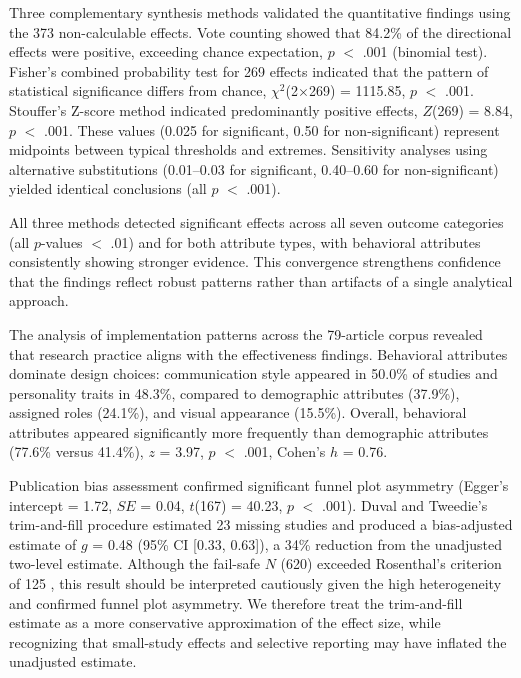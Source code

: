 \documentclass[lettersize,journal]{IEEEtran}
\begin{document}
Three complementary synthesis methods validated the quantitative findings using the 373 non-calculable effects. Vote counting showed that 84.2\% of the directional effects were positive, exceeding chance expectation, $p$ $<$ .001 (binomial test). Fisher's combined probability test for 269 effects indicated that the pattern of statistical significance differs from chance, $\chi^2$(2$\times$269) = 1115.85, $p$ $<$ .001. Stouffer's Z-score method indicated predominantly positive effects, $Z$(269) = 8.84, $p$ $<$ .001. These values (0.025 for significant, 0.50 for non-significant) represent midpoints between typical thresholds and extremes. Sensitivity analyses using alternative substitutions (0.01--0.03 for significant, 0.40--0.60 for non-significant) yielded identical conclusions (all $p$ $<$ .001).

All three methods detected significant effects across all seven outcome categories (all $p$-values $<$ .01) and for both attribute types, with behavioral attributes consistently showing stronger evidence. This convergence strengthens confidence that the findings reflect robust patterns rather than artifacts of a single analytical approach.

The analysis of implementation patterns across the 79-article corpus revealed that research practice aligns with the effectiveness findings. Behavioral attributes dominate design choices: communication style appeared in 50.0\% of studies and personality traits in 48.3\%, compared to demographic attributes (37.9\%), assigned roles (24.1\%), and visual appearance (15.5\%). Overall, behavioral attributes appeared significantly more frequently than demographic attributes (77.6\% versus 41.4\%), $z$ = 3.97, $p$ $<$ .001, Cohen's $h$ = 0.76.

Publication bias assessment confirmed significant funnel plot asymmetry (Egger's intercept = 1.72, $SE$ = 0.04, $t$(167) = 40.23, $p$ $<$ .001). Duval and Tweedie's trim-and-fill procedure estimated 23 missing studies and produced a bias-adjusted estimate of $g$ = 0.48 (95\% CI [0.33, 0.63]), a 34\% reduction from the unadjusted two-level estimate. Although the fail-safe $N$ (620) exceeded Rosenthal's criterion of 125 \cite{rosenthal1979file}, this result should be interpreted cautiously given the high heterogeneity and confirmed funnel plot asymmetry. We therefore treat the trim-and-fill estimate as a more conservative approximation of the effect size, while recognizing that small-study effects and selective reporting may have inflated the unadjusted estimate.
\end{document}

